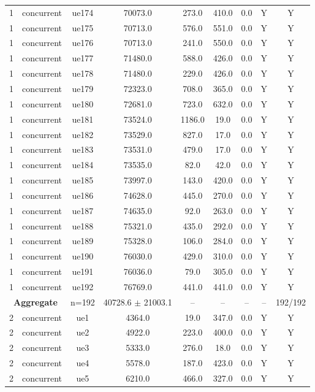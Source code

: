 \begin{table}[ht]
\begin{tabular}{|c|c|c|c|c|c|c|c|c|}
1 & concurrent & ue174 & 70073.0 & 273.0 & 410.0 & 0.0 & Y & Y \\
1 & concurrent & ue175 & 70713.0 & 576.0 & 551.0 & 0.0 & Y & Y \\
1 & concurrent & ue176 & 70713.0 & 241.0 & 550.0 & 0.0 & Y & Y \\
1 & concurrent & ue177 & 71480.0 & 588.0 & 426.0 & 0.0 & Y & Y \\
1 & concurrent & ue178 & 71480.0 & 229.0 & 426.0 & 0.0 & Y & Y \\
1 & concurrent & ue179 & 72323.0 & 708.0 & 365.0 & 0.0 & Y & Y \\
1 & concurrent & ue180 & 72681.0 & 723.0 & 632.0 & 0.0 & Y & Y \\
1 & concurrent & ue181 & 73524.0 & 1186.0 & 19.0 & 0.0 & Y & Y \\
1 & concurrent & ue182 & 73529.0 & 827.0 & 17.0 & 0.0 & Y & Y \\
1 & concurrent & ue183 & 73531.0 & 479.0 & 17.0 & 0.0 & Y & Y \\
1 & concurrent & ue184 & 73535.0 & 82.0 & 42.0 & 0.0 & Y & Y \\
1 & concurrent & ue185 & 73997.0 & 143.0 & 420.0 & 0.0 & Y & Y \\
1 & concurrent & ue186 & 74628.0 & 445.0 & 270.0 & 0.0 & Y & Y \\
1 & concurrent & ue187 & 74635.0 & 92.0 & 263.0 & 0.0 & Y & Y \\
1 & concurrent & ue188 & 75321.0 & 435.0 & 292.0 & 0.0 & Y & Y \\
1 & concurrent & ue189 & 75328.0 & 106.0 & 284.0 & 0.0 & Y & Y \\
1 & concurrent & ue190 & 76030.0 & 429.0 & 310.0 & 0.0 & Y & Y \\
1 & concurrent & ue191 & 76036.0 & 79.0 & 305.0 & 0.0 & Y & Y \\
1 & concurrent & ue192 & 76769.0 & 441.0 & 441.0 & 0.0 & Y & Y \\
\multicolumn{2}{|c|}{\textbf{Aggregate}} & n=192 & 40728.6 $\pm$ 21003.1 & -- & -- & -- & -- & 192/192 \\
\hline
2 & concurrent & ue1 & 4364.0 & 19.0 & 347.0 & 0.0 & Y & Y \\
2 & concurrent & ue2 & 4922.0 & 223.0 & 400.0 & 0.0 & Y & Y \\
2 & concurrent & ue3 & 5333.0 & 276.0 & 18.0 & 0.0 & Y & Y \\
2 & concurrent & ue4 & 5578.0 & 187.0 & 423.0 & 0.0 & Y & Y \\
2 & concurrent & ue5 & 6210.0 & 466.0 & 327.0 & 0.0 & Y & Y \\

\end{tabular}
\end{table}
